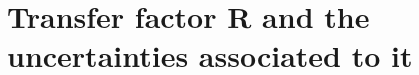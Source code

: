 \documentclass[11pt,a4paper,openright,twoside]{report}
\begin{document}
%

\chapter{Transfer factor R and the uncertainties associated to it}\label{ch:Results}
\end{document}
